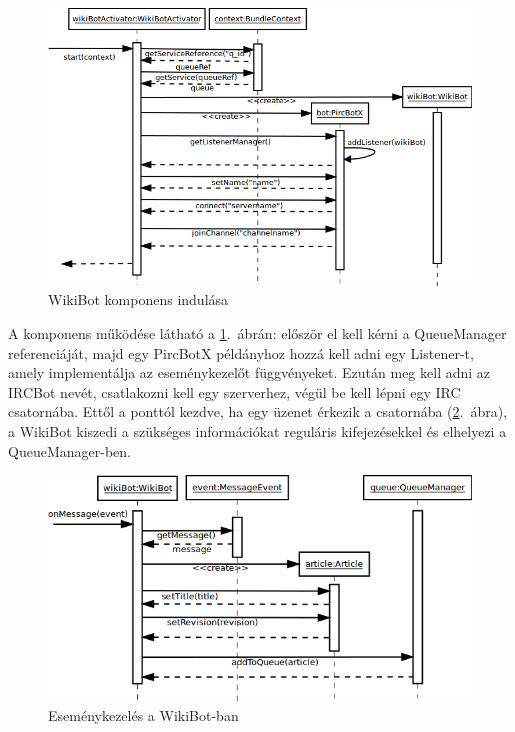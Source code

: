 \begin{figure}[htp]
\centering
\includegraphics[scale=0.5]{img/sequence_wikiBot}
\caption{WikiBot komponens indulása}
\label{fig:sequence_wikiBot}
\end{figure}

A komponens működése látható a \ref{fig:sequence_wikiBot}.~ábrán: először el kell kérni a QueueManager referenciáját, majd egy PircBotX példányhoz hozzá kell adni egy Listener-t, amely implementálja az eseménykezelőt függvényeket. Ezután meg kell adni az IRCBot nevét, csatlakozni kell egy szerverhez, végül be kell lépni egy IRC csatornába. Ettől a ponttól kezdve, ha egy üzenet érkezik a csatornába (\ref{fig:sequence_wikiBot2}.~ábra), a WikiBot kiszedi a szükséges információkat reguláris kifejezésekkel és elhelyezi a QueueManager-ben.

\begin{figure}[htp]
\centering
\includegraphics[scale=0.5]{img/sequence_wikiBot2}
\caption{Eseménykezelés a WikiBot-ban}
\label{fig:sequence_wikiBot2}
\end{figure}

